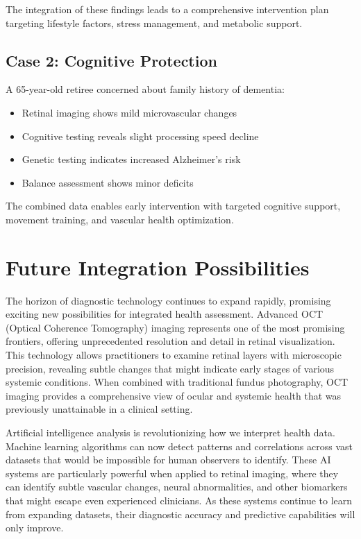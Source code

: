 \documentclass[
  Letterpaper,
]{scrbook}
\providecommand{\tightlist}{%
  \setlength{\itemsep}{0pt}\setlength{\parskip}{0pt}}\usepackage{longtable,booktabs,array}
\begin{document}
The integration of these findings leads to a comprehensive intervention
plan targeting lifestyle factors, stress management, and metabolic
support.

\subsection{Case 2: Cognitive
Protection}\label{case-2-cognitive-protection}

A 65-year-old retiree concerned about family history of dementia:

\begin{itemize}
\tightlist
\item
  Retinal imaging shows mild microvascular changes
\item
  Cognitive testing reveals slight processing speed decline
\item
  Genetic testing indicates increased Alzheimer's risk
\item
  Balance assessment shows minor deficits
\end{itemize}

The combined data enables early intervention with targeted cognitive
support, movement training, and vascular health optimization.

\section{Future Integration
Possibilities}\label{future-integration-possibilities}

The horizon of diagnostic technology continues to expand rapidly,
promising exciting new possibilities for integrated health assessment.
Advanced OCT (Optical Coherence Tomography) imaging represents one of
the most promising frontiers, offering unprecedented resolution and
detail in retinal visualization. This technology allows practitioners to
examine retinal layers with microscopic precision, revealing subtle
changes that might indicate early stages of various systemic conditions.
When combined with traditional fundus photography, OCT imaging provides
a comprehensive view of ocular and systemic health that was previously
unattainable in a clinical setting.

Artificial intelligence analysis is revolutionizing how we interpret
health data. Machine learning algorithms can now detect patterns and
correlations across vast datasets that would be impossible for human
observers to identify. These AI systems are particularly powerful when
applied to retinal imaging, where they can identify subtle vascular
changes, neural abnormalities, and other biomarkers that might escape
even experienced clinicians. As these systems continue to learn from
expanding datasets, their diagnostic accuracy and predictive
capabilities will only improve.
\end{document}
